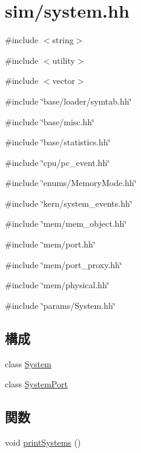 \hypertarget{sim_2system_8hh}{
\section{sim/system.hh}
\label{sim_2system_8hh}
}
{\ttfamily \#include $<$string$>$}\par
{\ttfamily \#include $<$utility$>$}\par
{\ttfamily \#include $<$vector$>$}\par
{\ttfamily \#include \char`\"{}base/loader/symtab.hh\char`\"{}}\par
{\ttfamily \#include \char`\"{}base/misc.hh\char`\"{}}\par
{\ttfamily \#include \char`\"{}base/statistics.hh\char`\"{}}\par
{\ttfamily \#include \char`\"{}cpu/pc\_\-event.hh\char`\"{}}\par
{\ttfamily \#include \char`\"{}enums/MemoryMode.hh\char`\"{}}\par
{\ttfamily \#include \char`\"{}kern/system\_\-events.hh\char`\"{}}\par
{\ttfamily \#include \char`\"{}mem/mem\_\-object.hh\char`\"{}}\par
{\ttfamily \#include \char`\"{}mem/port.hh\char`\"{}}\par
{\ttfamily \#include \char`\"{}mem/port\_\-proxy.hh\char`\"{}}\par
{\ttfamily \#include \char`\"{}mem/physical.hh\char`\"{}}\par
{\ttfamily \#include \char`\"{}params/System.hh\char`\"{}}\par
\subsection*{構成}
\begin{DoxyCompactItemize}
\item 
class \hyperlink{classSystem}{System}
\item 
class \hyperlink{classSystem_1_1SystemPort}{SystemPort}
\end{DoxyCompactItemize}
\subsection*{関数}
\begin{DoxyCompactItemize}
\item 
void \hyperlink{sim_2system_8hh_a55206d1ab112cc51ccc3bbefdcc5b923}{printSystems} ()
\end{DoxyCompactItemize}


